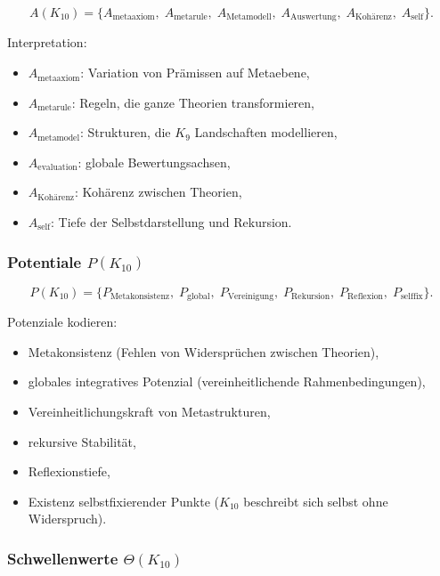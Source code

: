 \[
A(K_{10})=
\{
A_{\mathrm{metaaxiom}},\;
A_{\mathrm{metarule}},\;
A_{\mathrm{Metamodell}},\;
A_{\mathrm{Auswertung}},\;
A_{\mathrm{Kohärenz}},\;
A_{\mathrm{self}}
\}.
\]

Interpretation:
\begin{itemize}
    \item $A_{\mathrm{metaaxiom}}$: Variation von Prämissen auf Metaebene,
    \item $A_{\mathrm{metarule}}$: Regeln, die ganze Theorien transformieren,
    \item $A_{\mathrm{metamodel}}$: Strukturen, die $K_9$ Landschaften modellieren,
    \item $A_{\mathrm{evaluation}}$: globale Bewertungsachsen,
    \item $A_{\mathrm{Kohärenz}}$: Kohärenz zwischen Theorien,
    \item $A_{\mathrm{self}}$: Tiefe der Selbstdarstellung und Rekursion.
\end{itemize}

\subsubsection{Potentiale $P(K_{10})$}

\[
P(K_{10})=
\{
P_{\mathrm{Metakonsistenz}},\;
P_{\mathrm{global}},\;
P_{\mathrm{Vereinigung}},\;
P_{\mathrm{Rekursion}},\;
P_{\mathrm{Reflexion}},\;
P_{\mathrm{selffix}}
\}.
\]

Potenziale kodieren:
\begin{itemize}
    \item Metakonsistenz (Fehlen von Widersprüchen zwischen Theorien),
    \item globales integratives Potenzial (vereinheitlichende Rahmenbedingungen),
    \item Vereinheitlichungskraft von Metastrukturen,
    \item rekursive Stabilität,
    \item Reflexionstiefe,
    \item Existenz selbstfixierender Punkte ($K_{10}$ beschreibt sich selbst ohne Widerspruch).
\end{itemize}

\subsubsection{Schwellenwerte $\Theta(K_{10})$}

